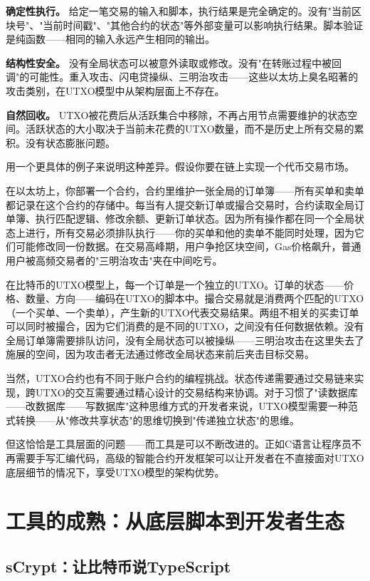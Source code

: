 \documentclass[a4paper,12pt,openany]{ctexbook}
\begin{document}
\textbf{确定性执行。} 给定一笔交易的输入和脚本，执行结果是完全确定的。没有"当前区块号"、"当前时间戳"、"其他合约的状态"等外部变量可以影响执行结果。脚本验证是纯函数——相同的输入永远产生相同的输出。

\textbf{结构性安全。} 没有全局状态可以被意外读取或修改。没有"在转账过程中被回调"的可能性。重入攻击、闪电贷操纵、三明治攻击——这些以太坊上臭名昭著的攻击类别，在UTXO模型中从架构层面上不存在。

\textbf{自然回收。} UTXO被花费后从活跃集合中移除，不再占用节点需要维护的状态空间。活跃状态的大小取决于当前未花费的UTXO数量，而不是历史上所有交易的累积。没有状态膨胀问题。

用一个更具体的例子来说明这种差异。假设你要在链上实现一个代币交易市场。

在以太坊上，你部署一个合约，合约里维护一张全局的订单簿——所有买单和卖单都记录在这个合约的存储中。每当有人提交新订单或撮合交易时，合约读取全局订单簿、执行匹配逻辑、修改余额、更新订单状态。因为所有操作都在同一个全局状态上进行，所有交易必须排队执行——你的买单和他的卖单不能同时处理，因为它们可能修改同一份数据。在交易高峰期，用户争抢区块空间，Gas价格飙升，普通用户被高频交易者的"三明治攻击"夹在中间吃亏。

在比特币的UTXO模型上，每一个订单是一个独立的UTXO。订单的状态——价格、数量、方向——编码在UTXO的脚本中。撮合交易就是消费两个匹配的UTXO（一个买单、一个卖单），产生新的UTXO代表交易结果。两组不相关的买卖订单可以同时被撮合，因为它们消费的是不同的UTXO，之间没有任何数据依赖。没有全局订单簿需要排队访问，没有全局状态可以被操纵——三明治攻击在这里失去了施展的空间，因为攻击者无法通过修改全局状态来前后夹击目标交易。

当然，UTXO合约也有不同于账户合约的编程挑战。状态传递需要通过交易链来实现，跨UTXO的交互需要通过精心设计的交易结构来协调。对于习惯了"读数据库——改数据库——写数据库"这种思维方式的开发者来说，UTXO模型需要一种范式转换——从"修改共享状态"的思维切换到"传递独立状态"的思维。

但这恰恰是工具层面的问题——而工具是可以不断改进的。正如C语言让程序员不再需要手写汇编代码，高级的智能合约开发框架可以让开发者在不直接面对UTXO底层细节的情况下，享受UTXO模型的架构优势。


\section*{工具的成熟：从底层脚本到开发者生态}



\subsection*{sCrypt：让比特币说TypeScript}
\end{document}
